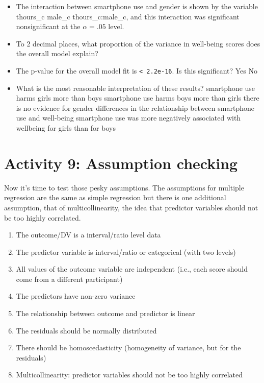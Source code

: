 \documentclass[]{book}
\providecommand{\tightlist}{%
  \setlength{\itemsep}{0pt}\setlength{\parskip}{0pt}}
\begin{document}
\begin{itemize}
\item
  The interaction between smartphone use and gender is shown by the variable thours\_c male\_c thours\_c:male\_c, and this interaction was significant nonsignificant at the \(\alpha = .05\) level.
\item
  To 2 decimal places, what proportion of the variance in well-being scores does the overall model explain? 
\item
  The p-value for the overall model fit is \texttt{\textless{}\ 2.2e-16}. Is this significant? Yes No
\item
  What is the most reasonable interpretation of these results? smartphone use harms girls more than boys smartphone use harms boys more than girls there is no evidence for gender differences in the relationship between smartphone use and well-being smartphone use was more negatively associated with wellbeing for girls than for boys
\end{itemize}

\hypertarget{activity-9-assumption-checking}{%
\section{Activity 9: Assumption checking}\label{activity-9-assumption-checking}}

Now it's time to test those pesky assumptions. The assumptions for multiple regression are the same as simple regression but there is one additional assumption, that of multicollinearity, the idea that predictor variables should not be too highly correlated.

\begin{enumerate}
\def\labelenumi{\arabic{enumi}.}
\tightlist
\item
  The outcome/DV is a interval/ratio level data
\item
  The predictor variable is interval/ratio or categorical (with two levels)
\item
  All values of the outcome variable are independent (i.e., each score should come from a different participant)
\item
  The predictors have non-zero variance
\item
  The relationship between outcome and predictor is linear
\item
  The residuals should be normally distributed
\item
  There should be homoscedasticity (homogeneity of variance, but for the residuals)
\item
  Multicollinearity: predictor variables should not be too highly correlated
\end{enumerate}
\end{document}
